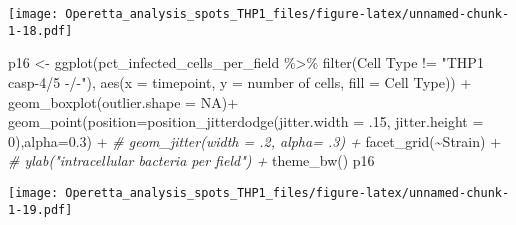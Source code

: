 \documentclass[
]{article}
\newenvironment{Shaded}{\begin{snugshade}}{\end{snugshade}}
\newcommand{\AttributeTok}[1]{\textcolor[rgb]{0.77,0.63,0.00}{#1}}
\newcommand{\CommentTok}[1]{\textcolor[rgb]{0.56,0.35,0.01}{\textit{#1}}}
\newcommand{\ConstantTok}[1]{\textcolor[rgb]{0.00,0.00,0.00}{#1}}
\newcommand{\DecValTok}[1]{\textcolor[rgb]{0.00,0.00,0.81}{#1}}
\newcommand{\FloatTok}[1]{\textcolor[rgb]{0.00,0.00,0.81}{#1}}
\newcommand{\FunctionTok}[1]{\textcolor[rgb]{0.00,0.00,0.00}{#1}}
\newcommand{\NormalTok}[1]{#1}
\newcommand{\OtherTok}[1]{\textcolor[rgb]{0.56,0.35,0.01}{#1}}
\newcommand{\SpecialCharTok}[1]{\textcolor[rgb]{0.00,0.00,0.00}{#1}}
\newcommand{\StringTok}[1]{\textcolor[rgb]{0.31,0.60,0.02}{#1}}
\begin{document}
\texttt{[image: Operetta\_analysis\_spots\_THP1\_files/figure-latex/unnamed-chunk-1-18.pdf]}

\begin{Shaded}
\begin{Highlighting}[]
\NormalTok{p16 }\OtherTok{\textless{}{-}} \FunctionTok{ggplot}\NormalTok{(pct\_infected\_cells\_per\_field }\SpecialCharTok{\%\textgreater{}\%}
                \FunctionTok{filter}\NormalTok{(}\StringTok{\textasciigrave{}}\AttributeTok{Cell Type}\StringTok{\textasciigrave{}} \SpecialCharTok{!=} \StringTok{"THP1 casp{-}4/5 {-}/{-}"}\NormalTok{), }\FunctionTok{aes}\NormalTok{(}\AttributeTok{x =}\NormalTok{ timepoint, }\AttributeTok{y =} \StringTok{\textasciigrave{}}\AttributeTok{number of cells}\StringTok{\textasciigrave{}}\NormalTok{, }\AttributeTok{fill =} \StringTok{\textasciigrave{}}\AttributeTok{Cell Type}\StringTok{\textasciigrave{}}\NormalTok{)) }\SpecialCharTok{+}
  \FunctionTok{geom\_boxplot}\NormalTok{(}\AttributeTok{outlier.shape =} \ConstantTok{NA}\NormalTok{)}\SpecialCharTok{+}
  \FunctionTok{geom\_point}\NormalTok{(}\AttributeTok{position=}\FunctionTok{position\_jitterdodge}\NormalTok{(}\AttributeTok{jitter.width =}\NormalTok{ .}\DecValTok{15}\NormalTok{, }\AttributeTok{jitter.height =} \DecValTok{0}\NormalTok{),}\AttributeTok{alpha=}\FloatTok{0.3}\NormalTok{) }\SpecialCharTok{+}
  \CommentTok{\#  geom\_jitter(width = .2, alpha= .3) +}
  \FunctionTok{facet\_grid}\NormalTok{(}\SpecialCharTok{\textasciitilde{}}\NormalTok{Strain) }\SpecialCharTok{+}
  \CommentTok{\#  ylab("intracellular bacteria per field") +}
  \FunctionTok{theme\_bw}\NormalTok{()}
\NormalTok{p16}
\end{Highlighting}
\end{Shaded}

\texttt{[image: Operetta\_analysis\_spots\_THP1\_files/figure-latex/unnamed-chunk-1-19.pdf]}
\end{document}
